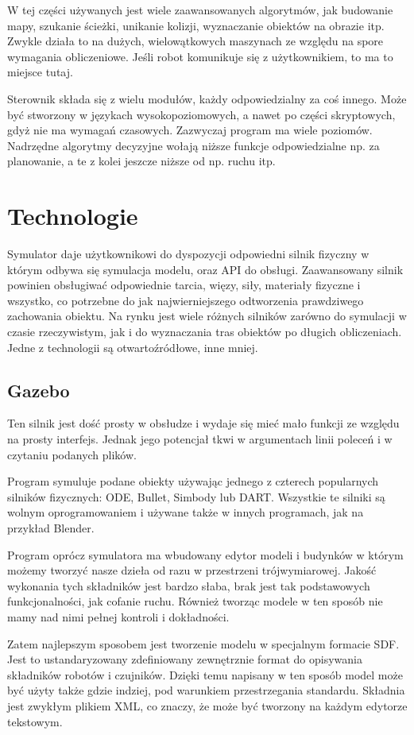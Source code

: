  W tej części używanych jest wiele zaawansowanych algorytmów, jak budowanie mapy, szukanie ścieżki, unikanie kolizji, wyznaczanie obiektów na obrazie itp.
 Zwykle działa to na dużych, wielowątkowych maszynach ze względu na spore wymagania obliczeniowe.
 Jeśli robot komunikuje się z użytkownikiem, to ma to miejsce tutaj.
 
 Sterownik składa się z wielu modułów, każdy odpowiedzialny za coś innego. Może być stworzony w językach wysokopoziomowych, a nawet po części skryptowych, gdyż nie ma wymagań czasowych.
 Zazwyczaj program ma wiele poziomów. Nadrzędne algorytmy decyzyjne wołają niższe funkcje odpowiedzialne np. za planowanie, a te z kolei jeszcze niższe od np. ruchu itp.

\section{Technologie}
Symulator daje użytkownikowi do dyspozycji odpowiedni silnik fizyczny w którym odbywa się symulacja modelu, oraz API do obsługi.
Zaawansowany silnik powinien obsługiwać odpowiednie tarcia, więzy, siły, materiały fizyczne i wszystko, co potrzebne do jak najwierniejszego odtworzenia prawdziwego zachowania obiektu.
Na rynku jest wiele różnych silników zarówno do symulacji w czasie rzeczywistym, jak i do wyznaczania tras obiektów po długich obliczeniach.
Jedne z technologii są otwartoźródłowe, inne mniej.

\subsection{Gazebo}
Ten silnik jest dość prosty w obsłudze i wydaje się mieć mało funkcji ze względu na prosty interfejs.
Jednak jego potencjał tkwi w argumentach linii poleceń i w czytaniu podanych plików.

Program symuluje podane obiekty używając jednego z czterech popularnych silników fizycznych: ODE, Bullet, Simbody lub DART.
Wszystkie te silniki są wolnym oprogramowaniem i używane także w innych programach, jak na przykład Blender.

Program oprócz symulatora ma wbudowany edytor modeli i budynków w którym możemy tworzyć nasze dzieła od razu w przestrzeni trójwymiarowej.
Jakość wykonania tych składników jest bardzo słaba, brak jest tak podstawowych funkcjonalności, jak cofanie ruchu.
Również tworząc modele w ten sposób nie mamy nad nimi pełnej kontroli i dokładności.

Zatem najlepszym sposobem jest tworzenie modelu w specjalnym formacie SDF. Jest to ustandaryzowany zdefiniowany zewnętrznie format do opisywania składników robotów i czujników.
Dzięki temu napisany w ten sposób model może być użyty także gdzie indziej, pod warunkiem przestrzegania standardu.
Składnia jest zwykłym plikiem XML, co znaczy, że może być tworzony na każdym edytorze tekstowym.

